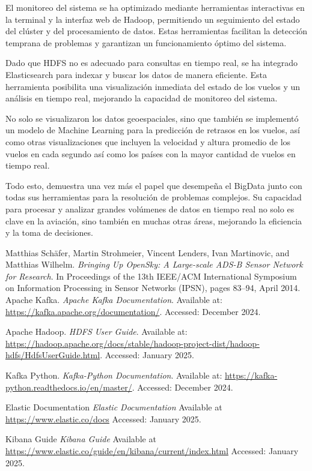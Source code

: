 \documentclass{article}
\begin{document}
El monitoreo del sistema se ha optimizado mediante herramientas interactivas en la terminal y la interfaz web de Hadoop, permitiendo un seguimiento del estado del clúster y del procesamiento de datos. Estas herramientas facilitan la detección temprana de problemas y garantizan un funcionamiento óptimo del sistema.

Dado que HDFS no es adecuado para consultas en tiempo real, se ha integrado Elasticsearch para indexar y buscar los datos de manera eficiente. Esta herramienta posibilita una visualización inmediata del estado de los vuelos y un análisis en tiempo real, mejorando la capacidad de monitoreo del sistema. 

No solo se visualizaron los datos geoespaciales, sino que también se implementó un modelo de Machine Learning para la predicción de retrasos en los vuelos, así como otras visualizaciones que incluyen la velocidad y altura promedio de los vuelos en cada segundo así como los países con la mayor cantidad de vuelos en tiempo real.

Todo esto, demuestra una vez más el papel que desempeña el BigData junto con todas sus herramientas para la resolución de problemas complejos. Su capacidad para procesar y analizar grandes volúmenes de datos en tiempo real no solo es clave en la aviación, sino también en muchas otras áreas, mejorando la eficiencia y la toma de decisiones.

\newpage

\begin{thebibliography}{9}

Matthias Schäfer, Martin Strohmeier, Vincent Lenders, Ivan Martinovic, and Matthias Wilhelm.
\textit{Bringing Up OpenSky: A Large-scale ADS-B Sensor Network for Research}.
In Proceedings of the 13th IEEE/ACM International Symposium on Information Processing in Sensor Networks (IPSN), pages 83--94, April 2014.
Apache Kafka.
\textit{Apache Kafka Documentation}.
Available at: \url{https://kafka.apache.org/documentation/}.
Accessed: December 2024.

Apache Hadoop.
\textit{HDFS User Guide}.
Available at: \url{https://hadoop.apache.org/docs/stable/hadoop-project-dist/hadoop-hdfs/HdfsUserGuide.html}.
Accessed: January 2025.

Kafka Python.
\textit{Kafka-Python Documentation}.
Available at: \url{https://kafka-python.readthedocs.io/en/master/}.
Accessed: December 2024.

Elastic Documentation
\textit{Elastic Documentation}
Available at \url{https://www.elastic.co/docs}
Accessed: January 2025.

Kibana Guide
\textit{Kibana Guide}
Available at \url{https://www.elastic.co/guide/en/kibana/current/index.html}
Accessed: January 2025.
\end{thebibliography}
\end{document}

